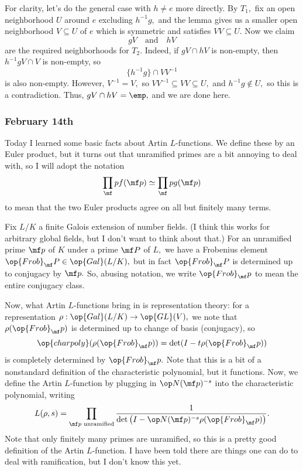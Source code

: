 For clarity, let's do the general case with $h\ne e$ more directly. By $T_1,$ fix an open neighborhood $U$ around $e$ excluding $h^{-1}g,$ and the lemma gives us a smaller open neighborhood $V\subseteq U$ of $e$ which is symmetric and satisfies $VV\subseteq U.$ Now we claim
\[gV\quad\text{and}\quad hV\]
are the required neighborhoods for $T_2.$ Indeed, if $gV\cap hV$ is non-empty, then $h^{-1}gV\cap V$ is non-empty, so
\[\{h^{-1}g\}\cap VV^{-1}\]
is also non-empty. However, $V^{-1}=V,$ so $VV^{-1}\subseteq VV\subseteq U,$ and $h^{-1}g\not\in U,$ so this is a contradiction. Thus, $gV\cap hV=\emp,$ and we are done here.

\subsubsection{February 14th}
Today I learned some basic facts about Artin $L$-functions. We define these by an Euler product, but it turns out that unramified primes are a bit annoying to deal with, so I will adopt the notation
\[\prod_\mf pf(\mf p)\simeq\prod_\mf pg(\mf p)\]
to mean that the two Euler products agree on all but finitely many terms.

Fix $L/K$ a finite Galois extension of number fields. (I think this works for arbitrary global fields, but I don't want to think about that.) For an unramified prime $\mf p$ of $K$ under a prime $\mf P$ of $L,$ we have a Frobenius element $\op{Frob}_\mf P\in\op{Gal}(L/K),$ but in fact $\op{Frob}_\mf P$ is determined up to conjugacy by $\mf p.$ So, abusing notation, we write $\op{Frob}_\mf p$ to mean the entire conjugacy class.

Now, what Artin $L$-functions bring in is representation theory: for a representation $\rho:\op{Gal}(L/K)\to\op{GL}(V),$ we note that $\rho(\op{Frob}_\mf p)$ is determined up to change of basis (conjugacy), so
\[\op{charpoly}(\rho(\op{Frob}_\mf p))=\det(I-t\rho(\op{Frob}_\mf p))\]
is completely determined by $\op{Frob}_\mf p.$ Note that this is a bit of a nonstandard definition of the characteristic polynomial, but it functions. Now, we define the Artin $L$-function by plugging in $\op N(\mf p)^{-s}$ into the characteristic polynomial, writing
\[L(\rho,s)=\prod_{\mf p\text{ unramified}}\frac1{\det\left(I-\op N(\mf p)^{-s}\rho(\op{Frob}_\mf p)\right)}.\]
Note that only finitely many primes are unramified, so this is a pretty good definition of the Artin $L$-function. I have been told there are things one can do to deal with ramification, but I don't know this yet.

